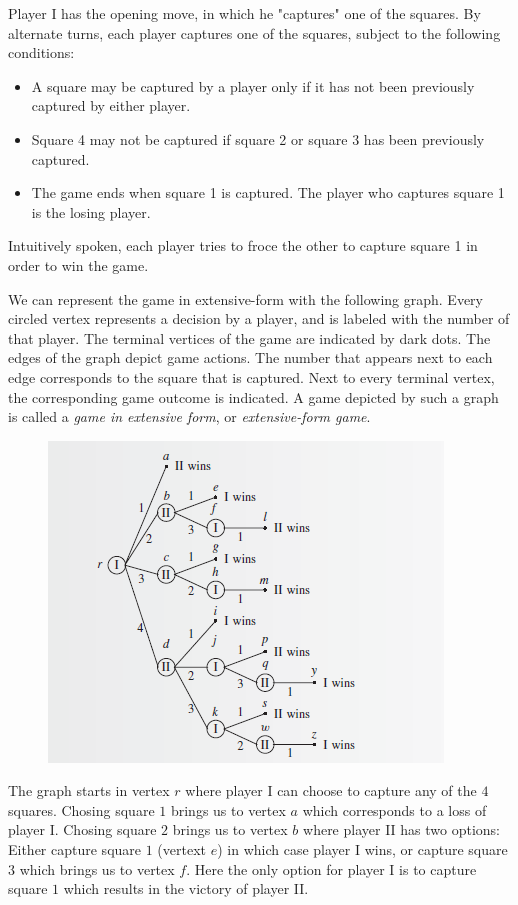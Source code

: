 Player I has the opening move, in which he "captures" one of the squares. By alternate turns, each player captures one of the squares, subject to the following conditions:

\begin{itemize}
	\item A square may be captured by a player only if it has not been previously captured by either player.
	\item Square 4 may not be captured if square 2 or square 3 has been previously captured.
	\item The game ends when square 1 is captured. The player who captures square 1 is the losing player.
\end{itemize}

Intuitively spoken, each player tries to froce the other to capture square 1 in order to win the game.

We can represent the game in extensive-form with the following graph. Every circled vertex represents a decision by a player, and is labeled with the number of that player. The terminal vertices of the game are indicated by dark dots. The edges of the graph depict game actions. The number that appears next to each edge corresponds to the square that is captured. Next to every terminal vertex, the corresponding game outcome is indicated. A game depicted by such a graph is called a \emph{game in extensive form}, or \emph{extensive-form game}.

\begin{figure}[H]
    \centering
    \includegraphics[scale=1.2]{images/2023-10-10-game_theory_02.png}
\end{figure}

The graph starts in vertex $r$ where player I can choose to capture any of the $4$ squares. Chosing square $1$ brings us to vertex $a$ which corresponds to a loss of player I. Chosing square $2$ brings us to vertex $b$ where player II has two options: Either capture square $1$ (vertext $e$) in which case player I wins, or capture square $3$ which brings us to vertex $f$. Here the only option for player I is to capture square $1$ which results in the victory of player II.

